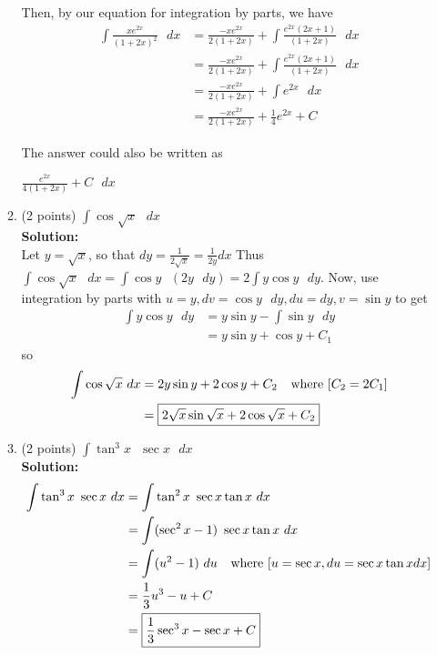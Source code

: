 \documentclass[paper=a4, fontsize=11pt]{scrartcl} %
\numberwithin{equation}{section} %
\numberwithin{figure}{section} %
\numberwithin{table}{section} %
\begin{document}
\begin{enumerate}
\begin{enumerate}
Then, by our equation for integration by parts, we have 
\begin{align*}
\int \frac{x e^{2x}}{(1+2x)^2} \text {  } dx &=\frac{- x e^{2x}}{2(1+2x)} + \int \frac{e^{2x}(2x+1)}{(1+2x)} \text {  } dx\\
&=\frac{- x e^{2x}}{2(1+2x)} + \int \frac{e^{2x}(2x+1)}{(1+2x)} \text {  } dx\\
&=\frac{- x e^{2x}}{2(1+2x)} + \int e^{2x} \text {  } dx\\
&= \boxed{ \frac{- x e^{2x}}{2(1+2x)} + \frac{1}{4}e^{2x} + C }
\end{align*} 

The answer could also be written as \begin{large}$\frac{e^{2x}}{4(1+2x)} + C \text {  } dx$\end{large}

\item (2 points) $\int \cos \sqrt{x} \text {  } dx$\\
\noindent\textbf{Solution:}\\
Let $y=\sqrt{x}$, so that $dy=\frac{1}{2\sqrt{x}}=\frac{1}{2y}dx$ Thus $\int \cos \sqrt{x} \text {  } dx= \int \cos y \text {  } (2y \text {  } dy) = 2 \int y \cos y \text{ } dy$.  Now, use integration by parts with $u=y, dv=\cos y \text {  } dy, du=dy, v = \sin y$ to get
\begin{align*}
\int y \cos y \text{ } dy &=y \sin y - \int \sin y \text{ } dy\\
&= y \sin y + \cos y + C_1 
\end{align*}
so
\begin{align*}
\int \cos \sqrt{x} \text {  } dx &=2 y \sin y + 2 \cos y + C_2  \hspace{.1in} \text{ where }[C_2 = 2 C_1]\\ 
&=  \boxed{2 \sqrt{x} \sin \sqrt{x} + 2 \cos \sqrt{x} + C_2 }
\end{align*}
\newpage
\item (2 points) $\int \tan^3 x\text { }  \sec x \text {  } dx$\\
\noindent\textbf{Solution:}\\
\begin{align*}
\int \tan^3 x\text { }  \sec x \text {  } dx &=\int \tan^2 x\text { }  \sec x \tan x \text {  } dx\\
&= \int (\sec^2x-1)\text { }  \sec x \tan x \text {  } dx\\
&= \int (u^2-1)\text { } du\hspace{.1in}\text{ where }[u=\sec x, du = \sec x \tan x dx]\\ 
&= \frac{1}{3}u^3-u+C\\ 
&= \boxed{ \frac{1}{3}\sec^3 x-\sec x+C }
\end{align*}
\end{enumerate}


\end{enumerate}

\end{document}

